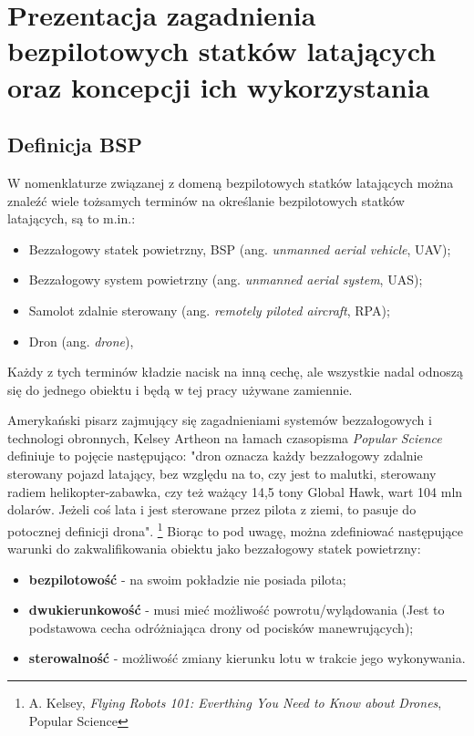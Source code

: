 \newpage
\section{Prezentacja zagadnienia bezpilotowych statków latających oraz koncepcji ich wykorzystania}
\subsection{Definicja BSP}
W nomenklaturze związanej z domeną bezpilotowych statków latających można znaleźć wiele tożsamych terminów na określanie bezpilotowych statków latających, są to m.in.:
\begin{itemize}
  \setlength\itemsep{1mm} %
  \item Bezzałogowy statek powietrzny, BSP (ang. \textit{unmanned aerial vehicle}, UAV);
  \item Bezzałogowy system powietrzny (ang. \textit{unmanned aerial system}, UAS);
  \item Samolot zdalnie sterowany (ang. \textit{remotely piloted aircraft}, RPA);
  \item Dron (ang. \textit{drone}),
\end{itemize}

Każdy z tych terminów kładzie nacisk na inną cechę, ale wszystkie nadal odnoszą się do jednego obiektu i będą w tej pracy używane zamiennie. 

Amerykański pisarz zajmujący się zagadnieniami systemów bezzałogowych i technologi obronnych,  Kelsey Artheon na łamach czasopisma \textit{Popular Science} definiuje to pojęcie następująco: "dron oznacza każdy bezzałogowy zdalnie sterowany pojazd latający, bez względu na to, czy jest to malutki, sterowany radiem helikopter-zabawka, czy też ważący 14,5 tony Global Hawk, wart 104 mln dolarów. Jeżeli coś lata i jest sterowane przez pilota z ziemi, to pasuje do potocznej definicji drona". \footnote{A. Kelsey, \textit{Flying Robots 101: Everthing You Need to Know about Drones}, Popular Science\cite{arton-kelsey}} Biorąc to pod uwagę, można zdefiniować następujące warunki do zakwalifikowania obiektu jako bezzałogowy statek powietrzny:
\begin{itemize}
  \item \textbf{bezpilotowość} - na swoim pokładzie nie posiada pilota;
  \item \textbf{dwukierunkowość} - musi mieć możliwość powrotu/wylądowania (Jest to podstawowa cecha odróżniająca drony od pocisków manewrujących); 
  \item \textbf{sterowalność} - możliwość zmiany kierunku lotu w trakcie jego wykonywania.\\\cite{dron-ibuk}\cite{arton-kelsey}
\end{itemize}

